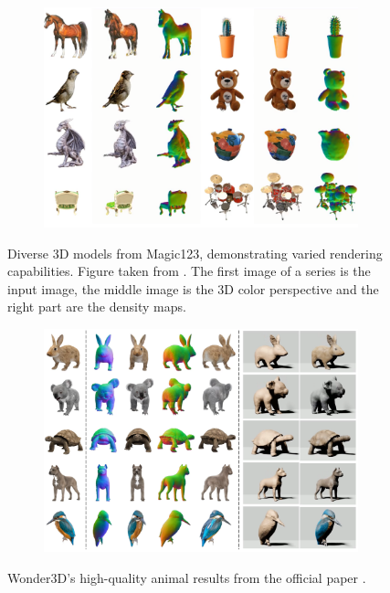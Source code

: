 \begin{figure}[ht]
    \centering
    \small
    \begin{subfigure}[b]{0.9\textwidth}
        \centering
        \includegraphics[width=\textwidth]{figures/appendix/magic123_examples.PNG}
        \caption{}
    \end{subfigure}
    \caption{Diverse 3D models from Magic123, demonstrating varied rendering capabilities. Figure taken from \citep{qian2023magic123}. The first image of a series is the input image, the middle image is the 3D color perspective and the right part are the density maps.}\label{fig:magic123Original}
\end{figure}


\begin{figure}[ht]
    \centering
    \small
    \begin{subfigure}[b]{0.9\textwidth}
        \centering
        \includegraphics[width=\textwidth]{figures/appendix/wonder3d_animal_examples.PNG}
        \caption{}
    \end{subfigure}
    \caption{Wonder3D's high-quality animal results from the official paper \citep{long2023wonder3d}.}\label{fig:wonder3dOriginal}
\end{figure}


